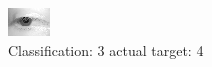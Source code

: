 \begin{figure}[h!]
\begin{center}
\includegraphics[width=0.60\columnwidth]{figures/ID2665_class_3_target_4.png}
\end{center}
\caption{ Classification: 3 actual target: 4}
\label{fig:ID2665_class_3_target_4}
\end{figure}
